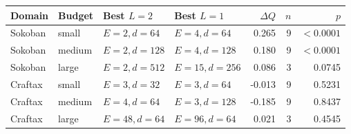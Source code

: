 \documentclass[10pt]{article}
\begin{document}
\setcounter{table}{3}
\begin{center}
\small
\setlength{\tabcolsep}{4.0pt}
\begin{tabular}{@{}llllrrr@{}}
  \toprule
  Domain & Budget & Best \(L=2\) & Best \(L=1\) & \(\Delta Q\) & \(n\) & \(p\) \\
  \midrule
  Sokoban & small & \(E=2,d=64\) & \(E=4,d=64\) & 0.265 & 9 & \(<0.0001\) \\
  Sokoban & medium & \(E=2,d=128\) & \(E=4,d=128\) & 0.180 & 9 & \(<0.0001\) \\
  Sokoban & large & \(E=2,d=512\) & \(E=15,d=256\) & 0.086 & 3 & 0.0745 \\
  Craftax & small & \(E=3,d=32\) & \(E=3,d=64\) & -0.013 & 9 & 0.5231 \\
  Craftax & medium & \(E=4,d=64\) & \(E=3,d=128\) & -0.185 & 9 & 0.8437 \\
  Craftax & large & \(E=48,d=64\) & \(E=96,d=64\) & 0.021 & 3 & 0.4545 \\
  \bottomrule
\end{tabular}
\end{center}
\vspace{0.5em}
\end{document}
